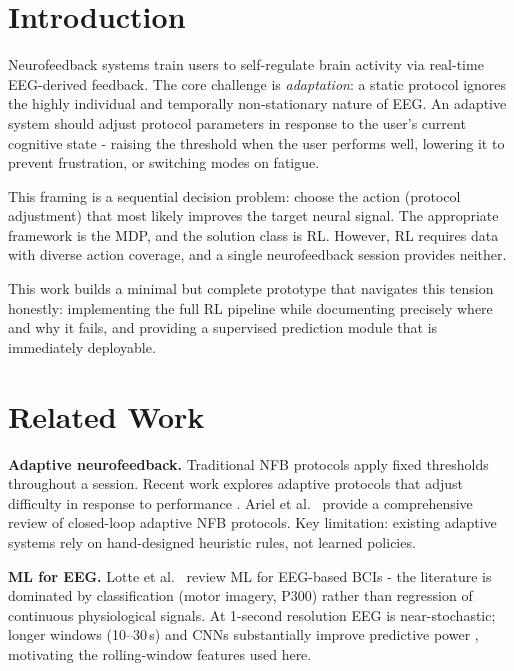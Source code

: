 \documentclass[11pt,a4paper]{article}
\begin{document}
\section{Introduction}

Neurofeedback systems train users to self-regulate brain activity via real-time
EEG-derived feedback. The core challenge is \emph{adaptation}: a static protocol
ignores the highly individual and temporally non-stationary nature of EEG. An
adaptive system should adjust protocol parameters in response to the user's
current cognitive state - raising the threshold when the user performs well,
lowering it to prevent frustration, or switching modes on fatigue.

This framing is a sequential decision problem: choose the action (protocol
adjustment) that most likely improves the target neural signal. The appropriate
framework is the MDP, and the solution class is RL. However, RL requires data
with diverse action coverage, and a single neurofeedback session provides neither.

This work builds a minimal but complete prototype that navigates this tension
honestly: implementing the full RL pipeline while documenting precisely where and
why it fails, and providing a supervised prediction module that is immediately
deployable.

\section{Related Work}

\textbf{Adaptive neurofeedback.}
Traditional NFB protocols apply fixed thresholds throughout a session. Recent
work explores adaptive protocols that adjust difficulty in response to performance
\cite{navas2022, zander2011}. Ariel et al.\ \cite{ariel2021} provide a
comprehensive review of closed-loop adaptive NFB protocols. Key limitation:
existing adaptive systems rely on hand-designed heuristic rules, not learned
policies.

\textbf{ML for EEG.}
Lotte et al.\ \cite{lotte2018} review ML for EEG-based BCIs - the literature is
dominated by classification (motor imagery, P300) rather than regression of
continuous physiological signals. At 1-second resolution EEG is near-stochastic;
longer windows (10--30\,s) and CNNs substantially improve predictive power
\cite{schirrmeister2017}, motivating the rolling-window features used here.
\end{document}
